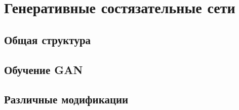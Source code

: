 \section{Генеративные состязательные сети}
	\subsection{Общая структура}
	\subsection{Обучение GAN}
	\subsection{Различные модификации}